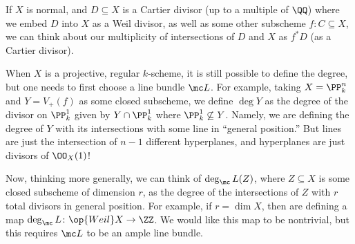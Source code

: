 \documentclass[../notes.tex]{subfiles}
\begin{document}
\begin{remark}
	If $X$ is normal, and $D\subseteq X$ is a Cartier divisor (up to a multiple of $\QQ$) where we embed $D$ into $X$ as a Weil divisor, as well as some other subscheme $f\colon C\subseteq X$, we can think about our multiplicity of intersections of $D$ and $X$ as $f^*D$ (as a Cartier divisor).
\end{remark}
When $X$ is a projective, regular $k$-scheme, it is still possible to define the degree, but one needs to first choose a line bundle $\mc L$. For example, taking $X=\PP^n_k$ and $Y=V_+(f)$ as some closed subscheme, we define $\deg Y$ as the degree of the divisor on $\PP^1_k$ given by $Y\cap\PP^1_k$ where $\PP^1_k\not\subseteq Y$. Namely, we are defining the degree of $Y$ with its intersections with some line in ``general position.'' But lines are just the intersection of $n-1$ different hyperplanes, and hyperplanes are just divisors of $\OO_X(1)$!

Now, thinking more generally, we can think of $\deg_\mc L(Z)$, where $Z\subseteq X$ is some closed subscheme of dimension $r$, as the degree of the intersections of $Z$ with $r$ total divisors in general position. For example, if $r=\dim X$, then are defining a map $\deg_\mc L\colon\op{Weil}X\to\ZZ$. We would like this map to be nontrivial, but this requires $\mc L$ to be an ample line bundle.
\end{document}
